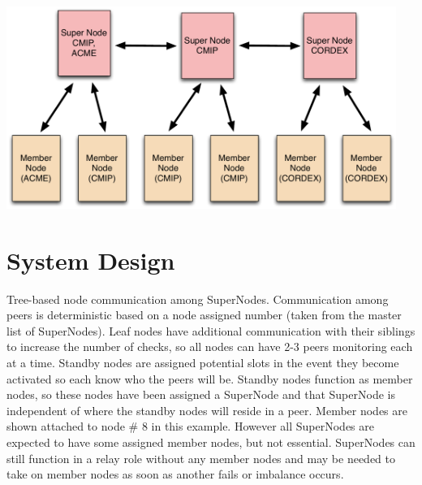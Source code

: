\documentclass[oneside,12pt]{memoir}
\begin{document}
\begin{center}
\includegraphics[width=5in]{presentation/ESG-node-org.pdf}
\end{center}

\section{System Design}

Tree-based node communication among SuperNodes.  Communication among peers is deterministic based on a node assigned number (taken from the master list of SuperNodes).   Leaf nodes have additional communication with their siblings to increase the number of checks, so all nodes can have 2-3 peers monitoring each at a time.  Standby nodes are assigned potential slots in the event they become activated so each know who the peers will be.  Standby nodes function as member nodes, so these nodes have been assigned a SuperNode and that SuperNode is independent of where the standby nodes will reside in a peer.  Member nodes are shown attached to node \# 8 in this example.  However all SuperNodes are expected to have some assigned member nodes, but not essential.  SuperNodes can still function in a relay role without any member nodes and may be needed to take on member nodes as soon as another fails or imbalance occurs. 
\end{document}
